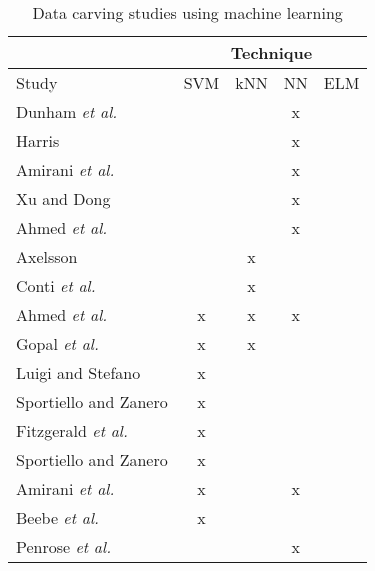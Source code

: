 \begin{table}[!ht]
\caption{Data carving studies using machine learning}
\label{tab:datacarvingstudies}
\begin{tabular}{l|c|c|c|c}

                                & \multicolumn{4}{c}{Technique} \\ \hline
Study                                     & SVM    & kNN    & NN   & ELM   \\ \hline
\hline
Dunham \textit{et al.} \cite{dunham_classifying_2005}       &        &        & x    &       \\ \hline
Harris \cite{harris_using_2007}             &        &        & x    &       \\ \hline
Amirani \textit{et al.} \cite{amirani_new_2008}              &        &        & x    &       \\ \hline
Xu and Dong \cite{xu_reassembling_2009}          &        &        & x    &       \\ \hline
Ahmed \textit{et al.} \cite{ahmed_content-based_2010}      &        &        & x    &       \\ \hline
Axelsson \cite{axelsson_normalised_2010}      &        & x      &      &       \\ \hline
Conti \textit{et al.} \cite{conti_automated_2010}          &        & x      &      &       \\ \hline
Ahmed \textit{et al.} \cite{ahmed_fast_2011}               & x      & x      & x    &       \\ \hline
Gopal \textit{et al.} \cite{gopal_statistical_2011}        & x      & x      &      &       \\ \hline
Luigi and Stefano \cite{luigi_file_2011}               & x      &        &      &       \\ \hline
Sportiello and Zanero \cite{sportiello_file_2011}          & x      &        &      &       \\ \hline
Fitzgerald \textit{et al.} \cite{fitzgerald_using_2012}         & x      &        &      &       \\ \hline
Sportiello and Zanero \cite{sportiello_context-based_2012} & x      &        &      &       \\ \hline
Amirani \textit{et al.} \cite{amirani_feature-based_2013}    & x      &        & x    &       \\ \hline
Beebe \textit{et al.} \cite{beebe_sceadan:_2013}           & x      &        &      &       \\ \hline
Penrose \textit{et al.} \cite{penrose_approaches_2013}       &        &        & x    &       \\ \hline

\end{tabular}
\end{table}
